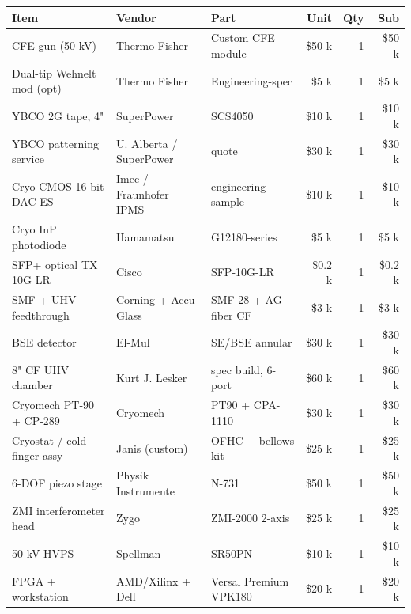 \documentclass[11pt,letterpaper]{article}
\begin{document}
\begin{center}
\small
\begin{longtable}{p{4.5cm} p{3cm} p{4cm} r r r}
\toprule
\textbf{Item} & \textbf{Vendor} & \textbf{Part} & \textbf{Unit} & \textbf{Qty} & \textbf{Sub} \\
\midrule
CFE gun (50 kV)                & Thermo Fisher       & Custom CFE module       & \$50 k & 1  & \$50 k  \\
Dual-tip Wehnelt mod (opt)     & Thermo Fisher       & Engineering-spec        & \$5 k  & 1  & \$5 k   \\
YBCO 2G tape, 4"               & SuperPower          & SCS4050                 & \$10 k & 1  & \$10 k  \\
YBCO patterning service        & U. Alberta / SuperPower & quote               & \$30 k & 1  & \$30 k  \\
Cryo-CMOS 16-bit DAC ES        & Imec / Fraunhofer IPMS & engineering-sample   & \$10 k & 1  & \$10 k  \\
Cryo InP photodiode            & Hamamatsu           & G12180-series           & \$5 k  & 1  & \$5 k   \\
SFP+ optical TX 10G LR         & Cisco               & SFP-10G-LR              & \$0.2 k & 1 & \$0.2 k \\
SMF + UHV feedthrough          & Corning + Accu-Glass & SMF-28 + AG fiber CF   & \$3 k  & 1  & \$3 k   \\
BSE detector                   & El-Mul              & SE/BSE annular          & \$30 k & 1  & \$30 k  \\
8" CF UHV chamber              & Kurt J. Lesker      & spec build, 6-port      & \$60 k & 1  & \$60 k  \\
Cryomech PT-90 + CP-289        & Cryomech            & PT90 + CPA-1110         & \$30 k & 1  & \$30 k  \\
Cryostat / cold finger assy    & Janis (custom)      & OFHC + bellows kit      & \$25 k & 1  & \$25 k  \\
6-DOF piezo stage              & Physik Instrumente  & N-731                   & \$50 k & 1  & \$50 k  \\
ZMI interferometer head        & Zygo                & ZMI-2000 2-axis         & \$25 k & 1  & \$25 k  \\
50 kV HVPS                     & Spellman            & SR50PN                  & \$10 k & 1  & \$10 k  \\
FPGA + workstation             & AMD/Xilinx + Dell   & Versal Premium VPK180   & \$20 k & 1  & \$20 k  \\

\end{longtable}
\end{center}
\end{document}
